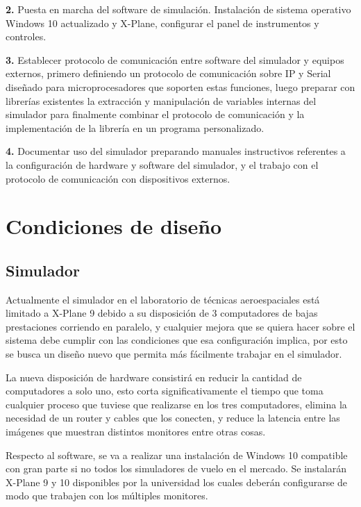 \textbf{2.} Puesta en marcha del software de simulación. Instalación de sistema operativo Windows 10 actualizado y X-Plane, configurar el panel de instrumentos y controles.

\textbf{3.} Establecer protocolo de comunicación entre software del simulador y equipos externos, primero definiendo un protocolo de comunicación sobre IP y Serial diseñado para microprocesadores que soporten estas funciones, luego preparar con librerías existentes la extracción y manipulación de variables internas del simulador para finalmente combinar el protocolo de comunicación y la implementación de la librería en un programa personalizado.

\textbf{4.} Documentar uso del simulador preparando manuales instructivos referentes a la configuración de hardware y software del simulador, y el trabajo con el protocolo de comunicación con dispositivos externos.

\section{Condiciones de diseño}

\subsection{Simulador}

Actualmente el simulador en el laboratorio de técnicas aeroespaciales está limitado a X-Plane 9 debido a su disposición de 3 computadores de bajas prestaciones corriendo en paralelo, y cualquier mejora que se quiera hacer sobre el sistema debe cumplir con las condiciones que esa configuración implica, por esto se busca un diseño nuevo que permita más fácilmente trabajar en el simulador. 

La nueva disposición de hardware consistirá en reducir la cantidad de computadores a solo uno, esto corta significativamente el tiempo que toma cualquier proceso que tuviese que realizarse en los tres computadores, elimina la necesidad de un router y cables que los conecten, y reduce la latencia entre las imágenes que muestran distintos monitores entre otras cosas.

Respecto al software, se va a realizar una instalación de Windows 10 compatible con gran parte si no todos los simuladores de vuelo en el mercado. Se instalarán X-Plane 9 y 10 disponibles por la universidad los cuales deberán configurarse de modo que trabajen con los múltiples monitores.

